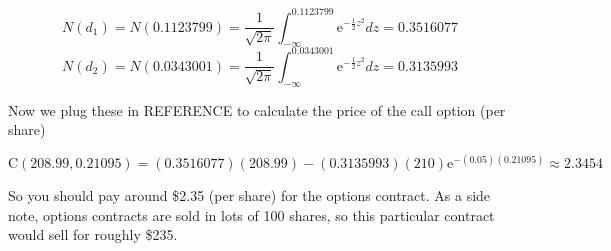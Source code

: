\documentclass{article}
\begin{document}
$$N(d_1)=N(0.1123799)=\frac{1}{\sqrt{2\pi}} \int_{-\infty}^{0.1123799} \mathrm e^{-\frac{1}{2}z^2} dz = 0.3516077$$
$$N(d_2)=N(0.0343001)=\frac{1}{\sqrt{2\pi}} \int_{-\infty}^{0.0343001} \mathrm e^{-\frac{1}{2}z^2} dz = 0.3135993$$

Now we plug these in REFERENCE to calculate the price of the call option (per share)

$$\mathrm C(208.99,0.21095)= (0.3516077)(208.99) - (0.3135993)(210) \mathrm e^{-(0.05)(0.21095)} \approx 2.3454$$

So you should pay around \$2.35 (per share) for the options contract. As a side note, options contracts are sold in lots of 100 shares, 
so this particular contract would sell for roughly \$235.
\end{document}
